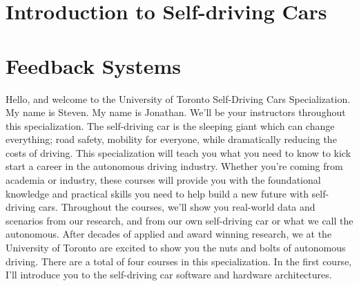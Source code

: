 \section{Introduction to Self-driving Cars}
\label{introduction}


\section{Feedback Systems}
Hello, and welcome to the University of Toronto Self-Driving Cars Specialization. My name is Steven. 
My name is Jonathan. We'll be your instructors throughout this specialization. 
The self-driving car is the sleeping giant which can change everything; road safety, mobility for everyone, 
while dramatically reducing the costs of driving. 
This specialization will teach you what you need to know to kick start a career in the autonomous driving industry. 
Whether you're coming from academia or industry, these courses will provide you with the foundational 
knowledge and practical skills you need to help build a new future with self-driving cars. 
Throughout the courses, we'll show you real-world data and scenarios from our research, and from our own self-driving car or 
what we call the autonomous. 
After decades of applied and award winning research, we at the University of Toronto are excited to show you the nuts and bolts of autonomous driving. 
There are a total of four courses in this specialization. In the first course, I'll introduce you to the self-driving car software and hardware architectures. 
